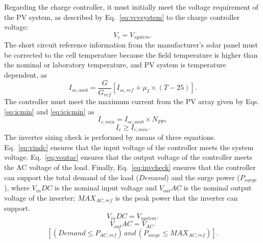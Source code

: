 \documentclass[runningheads]{llncs}
\begin{document}
%
Regarding the charge controller, it must initially meet the voltage requirement of the PV system, as described by Eq.~\ref{eq:vcvsystem} to the charge controller voltage: 
\begin{equation}
\label{eq:vcvsystem}
\scriptstyle V_{c} = \scriptstyle V_{system}.
\end{equation}
%
The short circuit reference information from the manufacturer's solar panel must be corrected to the cell temperature because the field temperature is higher than the nominal or laboratory temperature, and PV system is temperature dependent, as 
%
\begin{equation}
\label{eq:iscamb}
\scriptstyle I_{sc,amb} = \frac{\scriptstyle G}{\scriptstyle G_{ref}} \left[ \scriptstyle I_{sc,ref} + \scriptstyle \mu_{I} \scriptstyle \times \scriptstyle (T-25) \right]. 
\end{equation}
%
The controller must meet the maximum current from the PV array given by Eqs. \ref{eq:icmin} and \ref{eq:icicmin} as
\begin{equation}
\label{eq:icmin}
\scriptstyle I_{c,min} = \scriptstyle I_{sc,amb} \times \scriptstyle N_{PP},
\end{equation}
%
\begin{equation}
\label{eq:icicmin}
\scriptstyle I_{c} \geq \scriptstyle I_{c,min}.
\end{equation}
%
The inverter sizing check is performed by means of three equations. Eq.~\ref{eq:vindc} ensures that the input voltage of the controller meets the system voltage. Eq.~\ref{eq:voutac} ensures that the output voltage of the controller meets the AC voltage of the load. Finally, Eq.~\ref{eq:invcheck} ensures that the controller can support the total demand of the load ($Demand$) and the surge power ($P_{surge}$), where $V_{in}DC$ is the nominal input voltage and $V_{out}AC$ is the nominal output voltage of the inverter; $MAX_{AC,ref}$ is the peak power that the inverter can support.
%
\begin{equation}
\label{eq:vindc} 
\scriptstyle V_{in}DC = \scriptstyle V_{system}.
\end{equation}
%
\begin{equation}
\label{eq:voutac} 
\scriptstyle V_{out}AC = \scriptstyle V_{AC}.
\end{equation}
%
\begin{equation}
\label{eq:invcheck} 
\left[ (\scriptstyle Demand \leq \scriptstyle P_{AC,ref}) \, \scriptstyle and \, \scriptstyle (P_{surge} \leq MAX_{AC,ref}) \right].
\end{equation}
\end{document}
